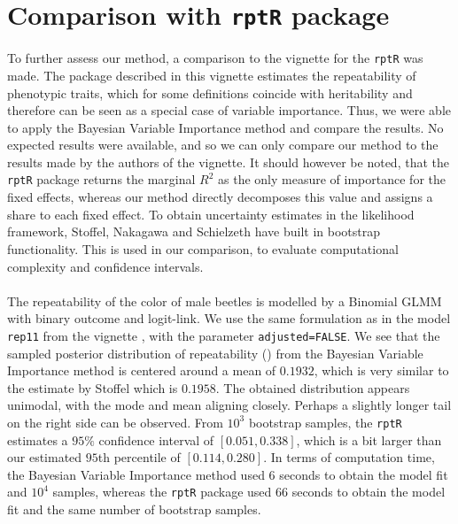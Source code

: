 \section{Comparison with \texttt{rptR} package}
To further assess our method, a comparison to the vignette for the \texttt{rptR} was made. The package described in this vignette estimates the repeatability of phenotypic traits, which for some definitions coincide with heritability and therefore can be seen as a special case of variable importance. Thus, we were able to apply the Bayesian Variable Importance method and compare the results. No expected results were available, and so we can only compare our method to the results made by the authors of the vignette. It should however be noted, that the \texttt{rptR} package returns the marginal $R^2$ as the only measure of importance for the fixed effects, whereas our method directly decomposes this value and assigns a share to each fixed effect. To obtain uncertainty estimates in the likelihood framework, Stoffel, Nakagawa and Schielzeth have built in bootstrap functionality. This is used in our comparison, to evaluate computational complexity and confidence intervals.
\\
\\
The repeatability of the color of male beetles is modelled by a Binomial GLMM with binary outcome and logit-link. We use the same formulation as in the model \texttt{rep11} from the vignette \citep{Stoffel2017rptR}, with the parameter \texttt{adjusted=FALSE}. We see that the sampled posterior distribution of repeatability () from the Bayesian Variable Importance method is centered around a mean of $0.1932$, which is very similar to the estimate by Stoffel which is $0.1958$. The obtained distribution appears unimodal, with the mode and mean aligning closely. Perhaps a slightly longer tail on the right side can be observed. From $10^3$ bootstrap samples, the \texttt{rptR} estimates a $95\%$ confidence interval of $[0.051, 0.338]$, which is a bit larger than our estimated $95$th percentile of $[0.114, 0.280]$. In terms of computation time, the Bayesian Variable Importance method used $6$ seconds to obtain the model fit and $10^4$ samples, whereas the \texttt{rptR} package used $66$ seconds to obtain the model fit and the same number of bootstrap samples.

